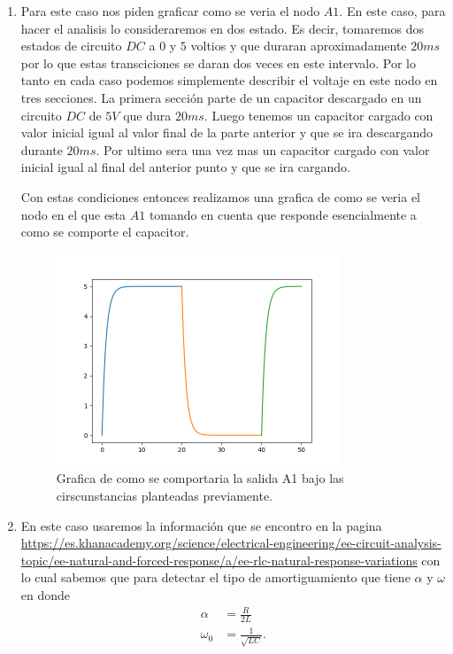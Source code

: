 \documentclass[12pt]{exam}
\begin{document}
\begin{enumerate}
\item Para este caso nos piden graficar como se veria el nodo $A 1$. En este caso, para hacer el analisis lo consideraremos en dos estado. Es decir, tomaremos dos estados de circuito $DC$ a $0$ y $5$ voltios y que duraran aproximadamente $20 ms$ por lo que estas transciciones se daran dos veces en este intervalo. Por lo tanto en cada caso podemos simplemente describir el voltaje en este nodo en tres secciones. La primera sección parte de un capacitor descargado en un circuito $DC$ de $5V$ que dura $20 ms$. Luego tenemos un capacitor cargado con valor inicial igual al valor final de la parte anterior y que se ira descargando durante $20 ms$. Por ultimo sera una vez mas un capacitor cargado con valor inicial igual al final del anterior punto y que se ira cargando.

  Con estas condiciones entonces realizamos una grafica de como se veria el nodo en el que esta $A 1$ tomando en cuenta que responde esencialmente a como se comporte el capacitor.

  \begin{figure}[H]
    \centering
    \includegraphics[width=0.8\textwidth]{grafica.png}
    \caption{Grafica de como se comportaria la salida A1 bajo las cirscunstancias planteadas previamente.}
    \label{fig:grafica}
  \end{figure}

\item En este caso usaremos la información que se encontro en la pagina \url{https://es.khanacademy.org/science/electrical-engineering/ee-circuit-analysis-topic/ee-natural-and-forced-response/a/ee-rlc-natural-response-variations} con lo cual sabemos que para detectar el tipo de amortiguamiento que tiene $\alpha$ y $\omega$ en donde
   \begin{align*}
    \alpha &= \frac{R}{2L} \\
    \omega_{0} &= \frac{1}{\sqrt{LC} }
  .\end{align*}


\end{enumerate}
\end{document}
